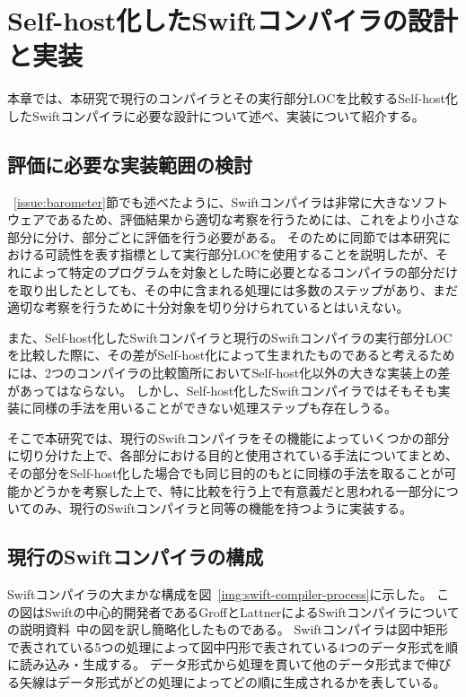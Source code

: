 \chapter{Self-host化したSwiftコンパイラの設計と実装}
\label{implementation}

本章では、本研究で現行のコンパイラとその実行部分LOCを比較するSelf-host化したSwiftコンパイラに必要な設計について述べ、実装について紹介する。

\section{評価に必要な実装範囲の検討}
\label{implementation:refinement}

~\ref{issue:barometer}節でも述べたように、Swiftコンパイラは非常に大きなソフトウェアであるため、評価結果から適切な考察を行うためには、これをより小さな部分に分け、部分ごとに評価を行う必要がある。
そのために同節では本研究における可読性を表す指標として実行部分LOCを使用することを説明したが、それによって特定のプログラムを対象とした時に必要となるコンパイラの部分だけを取り出したとしても、その中に含まれる処理には多数のステップがあり、まだ適切な考察を行うために十分対象を切り分けられているとはいえない。

また、Self-host化したSwiftコンパイラと現行のSwiftコンパイラの実行部分LOCを比較した際に、その差がSelf-host化によって生まれたものであると考えるためには、2つのコンパイラの比較箇所においてSelf-host化以外の大きな実装上の差があってはならない。
しかし、Self-host化したSwiftコンパイラではそもそも実装に同様の手法を用いることができない処理ステップも存在しうる。

そこで本研究では、現行のSwiftコンパイラをその機能によっていくつかの部分に切り分けた上で、各部分における目的と使用されている手法についてまとめ、その部分をSelf-host化した場合でも同じ目的のもとに同様の手法を取ることが可能かどうかを考察した上で、特に比較を行う上で有意義だと思われる一部分についてのみ、現行のSwiftコンパイラと同等の機能を持つように実装する。

\section{現行のSwiftコンパイラの構成}
\label{refinement:structure}

Swiftコンパイラの大まかな構成を図~\ref{img:swift-compiler-process}に示した。
この図はSwiftの中心的開発者であるGroffとLattnerによるSwiftコンパイラについての説明資料~\cite{sil}中の図を訳し簡略化したものである。
Swiftコンパイラは図中矩形で表されている5つの処理によって図中円形で表されている4つのデータ形式を順に読み込み・生成する。
データ形式から処理を貫いて他のデータ形式まで伸びる矢線はデータ形式がどの処理によってどの順に生成されるかを表している。

